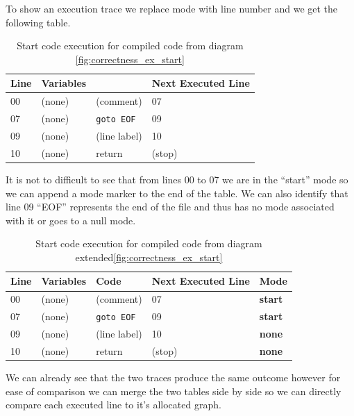 To show an execution trace we replace mode with line number and we get the following table.

\begin{table}[htcb]
	\caption{Start code execution for compiled code from diagram \ref{fig:correctness_ex_start}}
	\centering
		\begin{tabular}{| l | l | l | l |}
			\hline
			\textbf{Line} & \textbf{Variables} & \text{Code} & \textbf{Next Executed Line} \\
			\hline
			00 & (none) & (comment) & 07 \\
			\hline
			07 & (none) & \texttt{goto EOF} & 09 \\
			\hline
			09 & (none) & (line label) & 10 \\
			\hline
			10 & (none) & return & (stop) \\
			\hline
		\end{tabular}
	\label{table:BasicExecOnly}
\end{table}

It is not to difficult to see that from lines 00 to 07 we are in the ``start'' mode so we can append a
mode marker to the end of the table. We can also identify that line 09 ``EOF'' represents the end of the
file and thus has no mode associated with it or goes to a null mode.

\begin{table}[htcb]
	\caption{Start code execution for compiled code from diagram extended\ref{fig:correctness_ex_start}}
	\centering
		\begin{tabular}{| l | l | l | l | l |}
			\hline
			\textbf{Line} & \textbf{Variables} & \textbf{Code} & \textbf{Next Executed Line} & \textbf{Mode}\\
			\hline
			00 & (none) & (comment) & 07 & \textbf{start} \\
			\hline
			07 & (none) & \texttt{goto EOF} & 09 &  \textbf{start}\\
			\hline
			09 & (none) & (line label) & 10 & \textbf{none} \\
			\hline
			10 & (none) & return & (stop) & \textbf{none} \\
			\hline
		\end{tabular}
	\label{table:BasicExecMode}
\end{table}

We can already see that the two traces produce the same outcome however for ease of comparison we can
merge the two tables side by side so we can directly compare each executed line to it's allocated graph.


